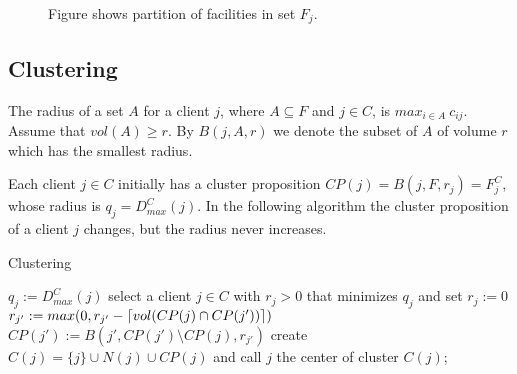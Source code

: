 \documentclass{llncs}
\DeclarePairedDelimiter{\ceil}{\lceil}{\rceil}
\begin{document}
\begin{figure}
  \caption{Figure shows partition of facilities in set $F_j$.}
  \label{partition_of_F_j}
\end{figure}
 
\subsection{Clustering}

\begin{definition}
 The radius of a set $A$ for a client $j$, where $A \subseteq F$ and $j \in C$, is $max_{i \in A}~c_{ij}$. Assume that $vol(A) \geq r$. By $B(j, A, r)$ we denote the subset of $A$ of volume $r$ which has the smallest radius.
\end{definition}

Each client $j \in C$ initially has a cluster proposition $CP(j) = B(j, F, r_j) = F_{j}^C$, whose radius is $q_j = D_{max}^{C}(j)$. In the following algorithm the cluster proposition of a client $j$ changes, but the radius never increases.
\begin{algorithm}
  \caption{Clustering}
\begin{algorithmic}[1]
  \STATE $q_j := D_{max}^{C}(j)$
 \ENDFOR
  \STATE select a client $j \in C$ with $r_j > 0$ that minimizes $q_j$ and set $r_j := 0$
   \STATE $r_{j'} := max(0, r_{j'} - \ceil{vol(CP(j) \cap CP(j'))})$
   \STATE $CP(j') := B(j', CP(j') \setminus CP(j), r_{j'})$
  \ENDFOR
  \STATE create $C(j) = \{j\} \cup N(j) \cup CP(j)$ and call $j$ the center of cluster $C(j)$;
 \ENDWHILE
\end{algorithmic}
\end{algorithm}
\end{document}
